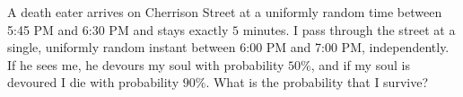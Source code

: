 A death eater arrives on Cherrison Street at a uniformly random time between 5:45 PM and 6:30 PM and stays exactly $5$ minutes. I pass through the street at a single, uniformly random instant between 6:00 PM and 7:00 PM, independently. If he sees me, he devours my soul with probability $50\%$, and if my soul is devoured I die with probability $90\%$. What is the probability that I survive?
